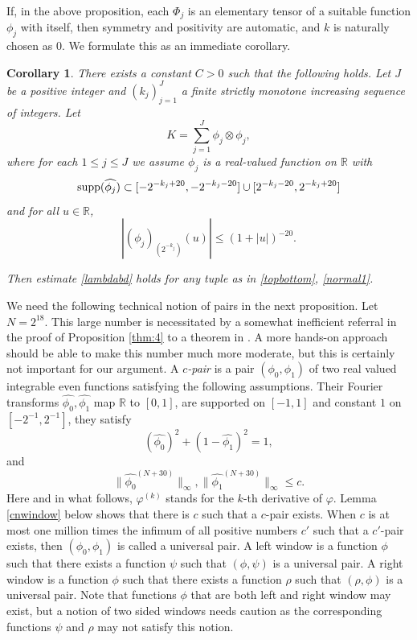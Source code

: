 \documentclass[12pt,reqno]{amsart}
\theoremstyle{plain}
\newtheorem{corollary}[theorem]{Corollary}
\theoremstyle{definition}
\numberwithin{equation}{section}
\newcommand{\R}{{\mathbb R}}
\begin{document}
If, in the above proposition, each $\Phi_j$ is an elementary tensor of a
suitable function $\phi_j$ with itself, then symmetry and positivity
are automatic, 
and $k$ is naturally chosen as $0$. 
We formulate this as an immediate corollary.

\begin{corollary}
\label{cor:1}
There exists a constant  $C>0$ such that the following holds. 
Let $J$ be a positive integer and   $(k_j)_{j=1}^J$ 
 a finite strictly monotone increasing sequence of integers. Let
\[K =\sum_{j=1}^J \phi_j\otimes \phi_j,\]
where for each $1\le j\le J$ we assume 
$\phi_j$ is a real-valued function on $\R$ with
\begin{equation*}%
{\rm supp} (\widehat{\phi_j})\subset 
[-2^{-k_j+20},-2^{-k_j-20}]\cup [2^{-k_j-20},2^{-k_j+20}]
\end{equation*}  
and for all $u\in \R$,
\begin{equation*}%
|(\phi_j)_{(2^{-k_j})}(u)| \leq  (1+|u|)^{-20}.
\end{equation*}

Then estimate \eqref{lambdabd} holds for any tuple as in \eqref{topbottom}, \eqref{normal1}.
\end{corollary}

 




We need the following technical notion of pairs in the next proposition. Let $N=2^{18}$. This large number
 is necessitated by a somewhat
inefficient referral in the proof of Proposition \ref{thm:4} to a theorem in \cite{MR4510172}.
A more hands-on approach should be able to
make this number much more moderate, but this is certainly not important for our argument.
A  {\em $c$-pair} is a pair $(\phi_0,\phi_1)$ of two real valued integrable even functions satisfying the following assumptions. Their Fourier transforms $\widehat{\phi_0},\widehat{\phi_1}$ map
$\R$ to $[0,1]$,
are supported on $[-1,1]$ and constant $1$ on
$[-2^{-1}, 2^{-1}]$, they satisfy 
\begin{equation}\label{windowsum}
(\widehat{\phi_0})^2+(1-\widehat{\phi_1})^2=1,
\end{equation}
 and
\begin{equation*}%
\|\widehat{\phi_0}^{(N+30)}\|_\infty , \|\widehat{\phi_1}^{(N+30)}\|_\infty\le c  .   
\end{equation*}
Here and in what follows, $\varphi^{(k)}$ stands for the $k$-th derivative of $\varphi$.
Lemma \ref{cnwindow} below shows that there is $c$ such that
a $c$-pair exists. When $c$ is at most one million
times the infimum of all positive numbers $c'$ such that a
$c'$-pair exists, then $(\phi_0,\phi_1)$ is called a 
universal pair.
A left window is a function $\phi$ such that there exists a function
$\psi$ such that $(\phi,\psi)$ is a universal pair. A right window
is a function $\phi$ such that there exists a function $\rho$
such that $(\rho,\phi)$ is a universal pair.
Note that functions $\phi$ that are both left and right window may exist, but a notion of two sided windows needs caution
as the corresponding functions $\psi$ and $\rho$ may not satisfy 
this notion.
\end{document}
